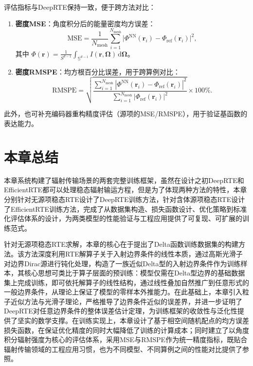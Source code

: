 评估指标与DeepRTE保持一致，便于跨方法对比：
\begin{enumerate}
    \item \textbf{密度MSE}：角度积分后的能量密度均方误差：
          \begin{equation}
              \text{MSE} = \frac{1}{N_{\text{mesh}}}\sum_{i=1}^{N_{\text{mesh}}} \big| \Phi^{\text{NN}}(\boldsymbol{r}_i) - \Phi_{\text{ref}}(\boldsymbol{r}_i) \big|^2,
          \end{equation}
          其中 $\Phi(\boldsymbol{r}) = \frac{1}{S^{d-1}}\int_{\mathbb{S}^{d-1}} I(\boldsymbol{r},\boldsymbol{\Omega})\,\mathrm{d}\boldsymbol{\Omega}$。

    \item \textbf{密度RMSPE}：均方根百分比误差，用于跨算例对比：
          \begin{equation}
              \text{RMSPE} = \sqrt{\frac{\sum_{i=1}^{N_{\text{mesh}}} |\Phi^{\text{NN}}(\boldsymbol{r}_i) - \Phi_{\text{ref}}(\boldsymbol{r}_i)|^2}{\sum_{i=1}^{N_{\text{mesh}}} |\Phi_{\text{ref}}(\boldsymbol{r}_i)|^2}} \times 100\%.
          \end{equation}
\end{enumerate}

此外，也可补充编码器重构精度评估（源项的MSE/RMSPE），用于验证基函数的表达能力。

\section{本章总结}

本章系统构建了辐射传输场景的两套完整训练框架，虽然在设计之初DeepRTE和EfficientRTE都可以处理稳态辐射输运方程，但是为了体现两种方法的特性，本章分别针对无源项稳态RTE设计了DeepRTE训练方法，针对含体源项稳态RTE设计了EfficientRTE训练方法，完成了从数据集构造、损失函数设计、优化策略到标准化评估体系的设计，为两类模型的性能验证与工程应用提供了可复现、可扩展的训练范式。

针对无源项稳态RTE求解，本章的核心在于提出了Delta函数训练数据集的构建方法。该方法深度利用RTE解算子关于入射边界条件的线性本质，通过高斯光滑子对边界Dirac源进行钝化处理，构造了一族近似Delta型的入射边界条件作为训练样本，其核心思想可类比于算子层面的预训练：模型仅需在Delta型边界的基础数据集上完成训练，即可依托解算子的线性结构，通过线性叠加自然推广到任意形式的一般边界条件，从理论上保证了模型的零样本外推能力。在此基础上，本章引入粒子近似方法与光滑子理论，严格推导了边界条件近似的误差界，并进一步证明了DeepRTE对任意边界条件的整体误差估计定理，为训练框架的收敛性与泛化性提供了坚实的数学支撑。在训练实现上，本章设计了基于相空间随机配点的均方误差损失函数，在保证优化精度的同时大幅降低了训练的计算成本；同时建立了以角度积分辐射强度为核心的评估体系，采用MSE与RMSPE作为统一精度指标，既贴合辐射传输领域的工程应用习惯，也为不同模型、不同算例之间的性能对比提供了参照。

